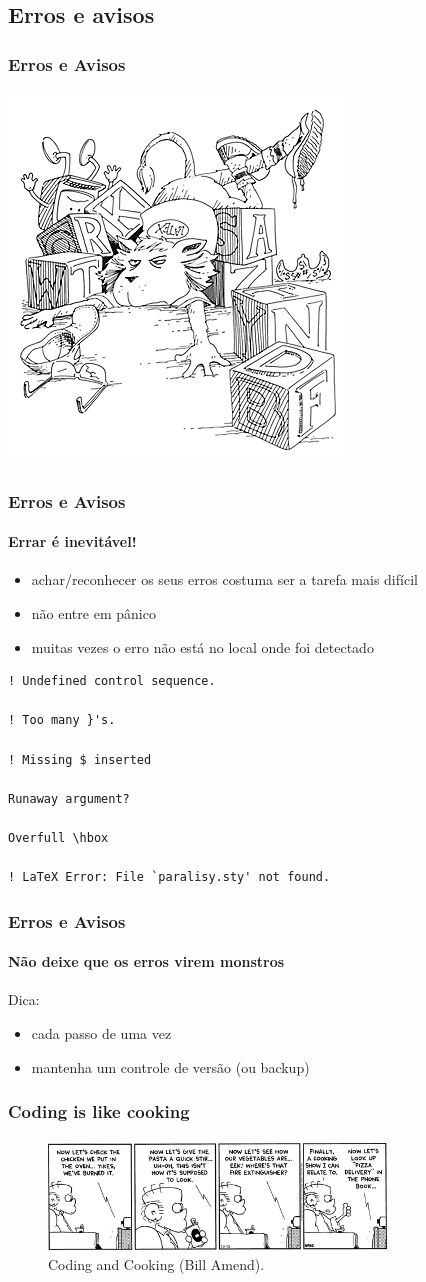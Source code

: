 \subsection{Erros e avisos}
\begin{frame}
\frametitle{Erros e Avisos}
\framesubtitle{}
\centering
\includegraphics[width=0.4\linewidth,height=0.7\textheight,keepaspectratio]{figures/lion03.png}
\end{frame}

\begin{frame}[fragile]
\frametitle{Erros e Avisos}
\framesubtitle{Errar é inevitável!}

\begin{itemize}
\item achar/reconhecer os seus erros costuma ser a tarefa mais difícil
\item não entre em pânico
\item muitas vezes o erro não está no local onde foi detectado
\end{itemize}

\begin{verbatim}
! Undefined control sequence.

! Too many }'s.

! Missing $ inserted

Runaway argument?

Overfull \hbox 

! LaTeX Error: File `paralisy.sty' not found.
\end{verbatim}
\end{frame}

\begin{frame}[fragile]
\frametitle{Erros e Avisos}
\framesubtitle{Não deixe que os erros virem monstros}
Dica:
\begin{itemize}
\item cada passo de uma vez
\item mantenha um controle de versão (ou backup)
\end{itemize}
\end{frame}

\begin{frame}[fragile]
\frametitle{Coding is like cooking}
\framesubtitle{}
\begin{figure}[h!]
\centering
\label{fig:cooking}
\includegraphics[width=0.8\textwidth,height=0.5\textheight,keepaspectratio]{figures/cooking.png}
\caption{Coding and Cooking (Bill Amend).}
\end{figure}
\end{frame}



